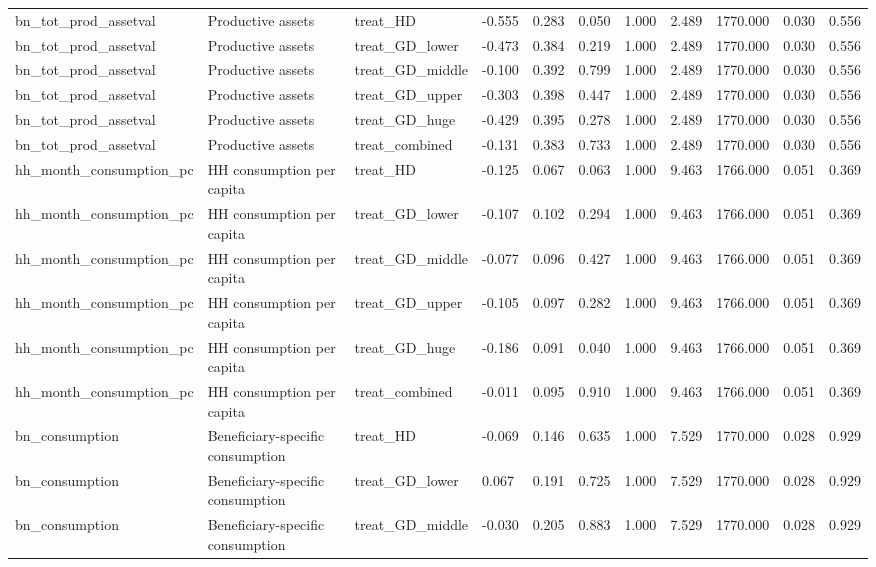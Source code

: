\begin{tabular}{lllllllllll}
bn\_tot\_prod\_assetval & Productive assets & treat\_HD & -0.555 & 0.283 & 0.050 & 1.000 & 2.489 & 1770.000 & 0.030 & 0.556 \\
bn\_tot\_prod\_assetval & Productive assets & treat\_GD\_lower & -0.473 & 0.384 & 0.219 & 1.000 & 2.489 & 1770.000 & 0.030 & 0.556 \\
bn\_tot\_prod\_assetval & Productive assets & treat\_GD\_middle & -0.100 & 0.392 & 0.799 & 1.000 & 2.489 & 1770.000 & 0.030 & 0.556 \\
bn\_tot\_prod\_assetval & Productive assets & treat\_GD\_upper & -0.303 & 0.398 & 0.447 & 1.000 & 2.489 & 1770.000 & 0.030 & 0.556 \\
bn\_tot\_prod\_assetval & Productive assets & treat\_GD\_huge & -0.429 & 0.395 & 0.278 & 1.000 & 2.489 & 1770.000 & 0.030 & 0.556 \\
bn\_tot\_prod\_assetval & Productive assets & treat\_combined & -0.131 & 0.383 & 0.733 & 1.000 & 2.489 & 1770.000 & 0.030 & 0.556 \\
hh\_month\_consumption\_pc & HH consumption per capita & treat\_HD & -0.125 & 0.067 & 0.063 & 1.000 & 9.463 & 1766.000 & 0.051 & 0.369 \\
hh\_month\_consumption\_pc & HH consumption per capita & treat\_GD\_lower & -0.107 & 0.102 & 0.294 & 1.000 & 9.463 & 1766.000 & 0.051 & 0.369 \\
hh\_month\_consumption\_pc & HH consumption per capita & treat\_GD\_middle & -0.077 & 0.096 & 0.427 & 1.000 & 9.463 & 1766.000 & 0.051 & 0.369 \\
hh\_month\_consumption\_pc & HH consumption per capita & treat\_GD\_upper & -0.105 & 0.097 & 0.282 & 1.000 & 9.463 & 1766.000 & 0.051 & 0.369 \\
hh\_month\_consumption\_pc & HH consumption per capita & treat\_GD\_huge & -0.186 & 0.091 & 0.040 & 1.000 & 9.463 & 1766.000 & 0.051 & 0.369 \\
hh\_month\_consumption\_pc & HH consumption per capita & treat\_combined & -0.011 & 0.095 & 0.910 & 1.000 & 9.463 & 1766.000 & 0.051 & 0.369 \\
bn\_consumption & Beneficiary-specific consumption & treat\_HD & -0.069 & 0.146 & 0.635 & 1.000 & 7.529 & 1770.000 & 0.028 & 0.929 \\
bn\_consumption & Beneficiary-specific consumption & treat\_GD\_lower & 0.067 & 0.191 & 0.725 & 1.000 & 7.529 & 1770.000 & 0.028 & 0.929 \\
bn\_consumption & Beneficiary-specific consumption & treat\_GD\_middle & -0.030 & 0.205 & 0.883 & 1.000 & 7.529 & 1770.000 & 0.028 & 0.929 \\

\end{tabular}
